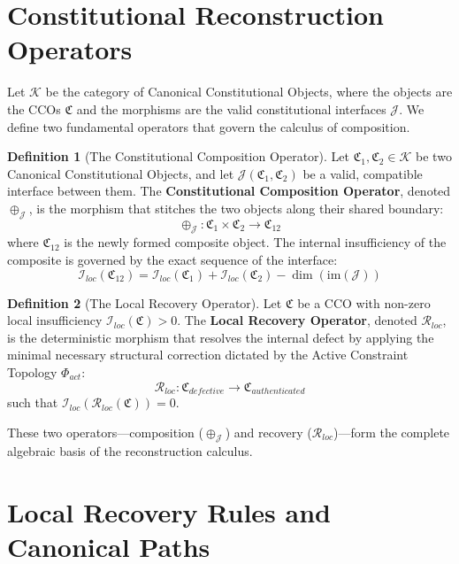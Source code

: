 \documentclass[12pt,openany]{extbook}
\theoremstyle{plain}
\theoremstyle{definition}
\newtheorem{definition}{Definition}[chapter]
\begin{document}
\section{Constitutional Reconstruction Operators}

Let $\mathcal{K}$ be the category of Canonical Constitutional Objects, where the objects are the CCOs $\mathfrak{C}$ and the morphisms are the valid constitutional interfaces $\mathcal{J}$. We define two fundamental operators that govern the calculus of composition.

\begin{definition}[The Constitutional Composition Operator]
Let $\mathfrak{C}_1, \mathfrak{C}_2 \in \mathcal{K}$ be two Canonical Constitutional Objects, and let $\mathcal{J}(\mathfrak{C}_1, \mathfrak{C}_2)$ be a valid, compatible interface between them. The \textbf{Constitutional Composition Operator}, denoted $\oplus_{\mathcal{J}}$, is the morphism that stitches the two objects along their shared boundary:
\[
\oplus_{\mathcal{J}} : \mathfrak{C}_1 \times \mathfrak{C}_2 \longrightarrow \mathfrak{C}_{12}
\]
where $\mathfrak{C}_{12}$ is the newly formed composite object. The internal insufficiency of the composite is governed by the exact sequence of the interface:
\[
\mathcal{I}_{loc}(\mathfrak{C}_{12}) = \mathcal{I}_{loc}(\mathfrak{C}_1) + \mathcal{I}_{loc}(\mathfrak{C}_2) - \dim(\text{im}(\mathcal{J}))
\]
\end{definition}

\begin{definition}[The Local Recovery Operator]
Let $\mathfrak{C}$ be a CCO with non-zero local insufficiency $\mathcal{I}_{loc}(\mathfrak{C}) > 0$. The \textbf{Local Recovery Operator}, denoted $\mathcal{R}_{loc}$, is the deterministic morphism that resolves the internal defect by applying the minimal necessary structural correction dictated by the Active Constraint Topology $\Phi_{act}$:
\[
\mathcal{R}_{loc} : \mathfrak{C}_{defective} \longrightarrow \mathfrak{C}_{authenticated}
\]
such that $\mathcal{I}_{loc}(\mathcal{R}_{loc}(\mathfrak{C})) = 0$.
\end{definition}

These two operators—composition ($\oplus_{\mathcal{J}}$) and recovery ($\mathcal{R}_{loc}$)—form the complete algebraic basis of the reconstruction calculus.

\section{Local Recovery Rules and Canonical Paths}
\end{document}
